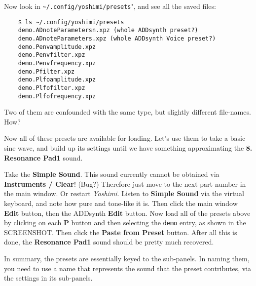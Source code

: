    Now look in \texttt{\textasciitilde/.config/yoshimi/presets}",
   and see all the saved files:

\begin{verbatim}
	$ ls ~/.config/yoshimi/presets
	demo.ADnoteParametersn.xpz (whole ADDsynth preset?)
	demo.ADnoteParameters.xpz (whole ADDsynth Voice preset?)
	demo.Penvamplitude.xpz
	demo.Penvfilter.xpz
	demo.Penvfrequency.xpz
	demo.Pfilter.xpz
	demo.Plfoamplitude.xpz
	demo.Plfofilter.xpz
	demo.Plfofrequency.xpz
\end{verbatim}

	Two of them are confounded with the same type, but slightly
   different file-names.  How?

   Now all of these presets are available for loading.
   Let's use them to take a basic sine wave, and build up its settings until
   we have something approximating the \textbf{8. Resonance Pad1} sound.
   
   Take the \textbf{Simple Sound}. 
   This sound currently cannot be obtained via \textbf{Instruments / Clear}!
   (Bug?)
   Therefore just move to the next part number in the main window.
   Or restart \textsl{Yoshimi}.
   Listen to \textbf{Simple Sound} via the virtual keyboard, and note
   how pure and tone-like it is.
   Then click the main window \textbf{Edit} button, then the
   ADDsynth \textbf{Edit} button.
   Now load all of the presets above by clicking on each \textbf{P}
   button and then selecting the \texttt{demo} entry, 
   as shown in the SCREENSHOT.
   Then click the \textbf{Paste from Preset} button.
   After all this is done, the
   \textbf{Resonance Pad1} sound should 
   be pretty much recovered.

   In summary, the presets are essentially keyed to the sub-panels.
   In naming them, you need to use a name that represents the sound that the
   preset contributes, via the settings in its sub-panels.

